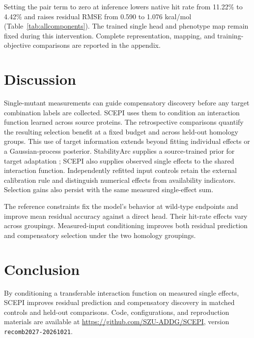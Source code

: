 \documentclass{llncs}
\begin{document}
Setting the pair term to zero at inference lowers native hit rate from 11.22\% to 4.42\% and raises residual RMSE from 0.590 to 1.076 kcal/mol (Table~\ref{tab:allcomponents}). The trained single head and phenotype map remain fixed during this intervention. Complete representation, mapping, and training-objective comparisons are reported in the appendix.

\section{Discussion}

Single-mutant measurements can guide compensatory discovery before any target combination labels are collected. SCEPI uses them to condition an interaction function learned across source proteins. The retrospective comparisons quantify the resulting selection benefit at a fixed budget and across held-out homology groups. This use of target information extends beyond fitting individual effects or a Gaussian-process posterior. StabilityArc supplies a source-trained prior for target adaptation \citep{feller2026}; SCEPI also supplies observed single effects to the shared interaction function. Independently refitted input controls retain the external calibration rule and distinguish numerical effects from availability indicators. Selection gains also persist with the same measured single-effect sum.

The reference constraints fix the model's behavior at wild-type endpoints and improve mean residual accuracy against a direct head. Their hit-rate effects vary across groupings. Measured-input conditioning improves both residual prediction and compensatory selection under the two homology groupings.

\section{Conclusion}

By conditioning a transferable interaction function on measured single effects, SCEPI improves residual prediction and compensatory discovery in matched controls and held-out comparisons. Code, configurations, and reproduction materials are available at \url{https://github.com/SZU-ADDG/SCEPI}, version \texttt{recomb2027-20261021}.
\end{document}
